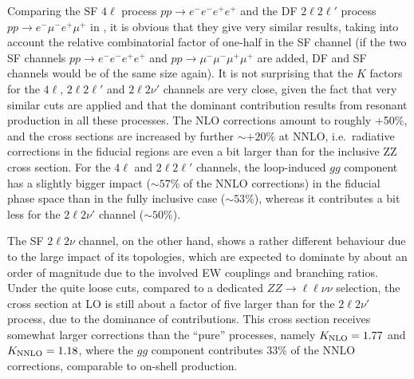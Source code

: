 \documentclass[english,11pt]{article}
\begin{document}
Comparing the SF $4\ell$ process $pp \to e^- e^- e^+ e^+$ and the DF $2\ell2\ell'$ process 
$pp \to e^- \mu^- e^+ \mu^+$ 
in , it is obvious that they give very similar results,
taking into account the relative combinatorial factor of one-half in the SF channel
(if the two SF channels $pp \to e^- e^- e^+ e^+$ and $pp \to \mu^- \mu^- \mu^+ \mu^+$ 
are added, DF and SF channels would be of the same size again).
It is not surprising that the 
$K$ factors for the $4\ell$, $2\ell 2\ell'$ and $2\ell 2\nu'$ channels are 
very close, given the fact that very similar cuts are applied and that the dominant 
contribution results from resonant \zz{} production in all these processes.
The NLO corrections amount to 
roughly +50\%, and the cross sections are increased by further $\sim+20\%$ at NNLO, i.e.\ 
radiative corrections in the fiducial regions are even a bit larger than for the 
inclusive ZZ cross section. 
For the $4\ell$ and $2\ell 2\ell'$ channels, 
the loop-induced $gg$ component has a slightly bigger impact ($\sim 57\%$ of the NNLO corrections) in the fiducial phase space 
than in the fully inclusive case ($\sim 53\%$), whereas it contributes a bit less  
for the $2\ell 2\nu'$ channel ($\sim 50$\%). 

The SF $2\ell 2\nu$ channel, 
on the other hand, shows a rather different behaviour due to the large impact of its 
\ww{} topologies, which are expected to dominate by about an order of magnitude
due to the involved EW couplings and branching ratios. Under the quite loose cuts,
compared to a dedicated $ZZ\to\ell\ell\nu\nu$ selection, the cross section at LO is still
about a factor of five larger than for the $2\ell 2\nu'$ process, due to the dominance
of \ww{} contributions. This cross section receives somewhat larger corrections than 
the ``pure'' \zz{} processes, namely $K_{\rm NLO}=1.77$ and $K_{\rm NNLO}=1.18$, where 
the $gg$ component contributes $33$\% of the NNLO corrections, comparable to on-shell 
\ww{} production. 
\end{document}
